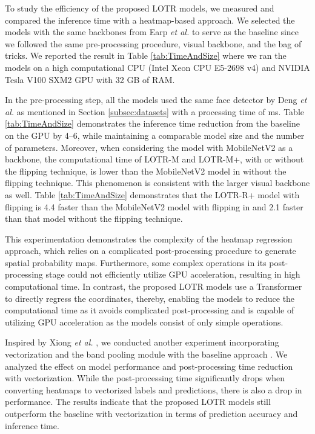 \documentclass[journal]{IEEEtran}
\begin{document}
To study the efficiency of the proposed LOTR models, we measured and compared the inference time with a heatmap-based approach. 
We selected the models with the same backbones from Earp \textit{et al.} \cite{earp2021sub} to serve as the baseline since we followed the same pre-processing procedure, visual backbone, and the bag of tricks.
We reported the result in Table \ref{tab:TimeAndSize} where we ran the models on a high computational CPU (Intel Xeon CPU E5-2698 v4) and NVIDIA Tesla V100 SXM2 GPU with 32 GB of RAM.

In the pre-processing step, all the models used the same face detector by Deng \textit{et al.} \cite{deng2019} as mentioned in Section \ref{subsec:datasets} with a processing time of  ms.
Table \ref{tab:TimeAndSize} demonstrates the inference time reduction from the baseline on the GPU by 4--6, while maintaining a comparable model size and the number of parameters.
Moreover, when considering the model with MobileNetV2 as a backbone, the computational time of LOTR-M and LOTR-M+, with or without the flipping technique, is lower than the MobileNetV2 model in \cite{earp2021sub} without the flipping technique. 
This phenomenon is consistent with the larger visual backbone as well.
Table \ref{tab:TimeAndSize} demonstrates that the LOTR-R+ model with flipping is 4.4 faster than the MobileNetV2 model with flipping in \cite{earp2021sub} and 2.1 faster than that model without the flipping technique.

This experimentation demonstrates the complexity of the heatmap regression approach, which relies on a complicated post-processing procedure to generate spatial probability maps. 
Furthermore, some complex operations in its post-processing stage could not efficiently utilize GPU acceleration, resulting in high computational time. 
In contrast, the proposed LOTR models use a Transformer to directly regress the coordinates, thereby, enabling the models to reduce the computational time as it avoids complicated post-processing and is capable of utilizing GPU acceleration as the models consist of only simple operations.

Inspired by Xiong \textit{et al.} \cite{xiong2020}, we conducted another experiment incorporating vectorization and the band pooling module with the baseline approach \cite{earp2021sub}.
We analyzed the effect on model performance and post-processing time reduction with vectorization.
While the post-processing time significantly drops when converting heatmaps to vectorized labels and predictions, there is also a drop in performance. 
The results indicate that the proposed LOTR models still outperform the baseline with vectorization in terms of prediction accuracy and inference time.
\end{document}
